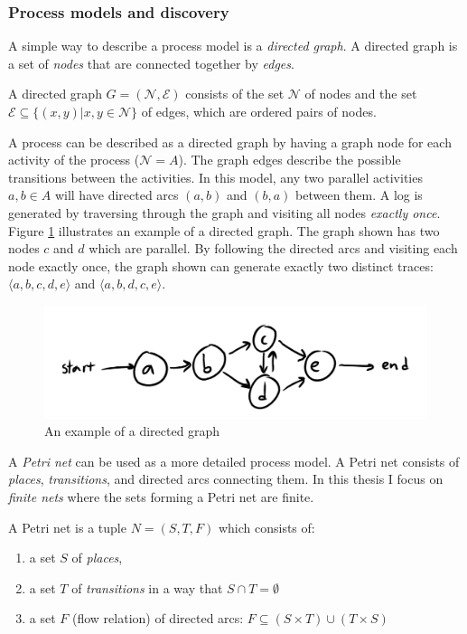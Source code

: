 \subsubsection{Process models and discovery}
\label{sec:processmodelsdsc}

A simple way to describe a process model is a \emph{directed graph}. A directed graph is a set of \emph{nodes} that are connected together by \emph{edges}. 

\begin{definition}
A directed graph $G = (\mathcal{N}, \mathcal{E})$ consists of the set $\mathcal{N}$ of nodes and the set $\mathcal{E} \subseteq \{ (x,y) | x,y \in \mathcal{N} \} $ of edges, which are ordered pairs of nodes.
\end{definition}

A process can be described as a directed graph by having a graph node for each activity of the process ($\mathcal{N} = A$). The graph edges describe the possible transitions between the activities.
In this model, any two parallel activities $a, b \in A$ will have directed arcs $(a,b)$ and $(b,a)$ between them.
A log is generated by traversing through the graph and visiting all nodes \textit{exactly once}.
Figure \ref{fig:directedgraph} illustrates an example of a directed graph.
The graph shown has two nodes $c$ and $d$ which are parallel.
By following the directed arcs and visiting each node exactly once, the graph shown can generate exactly two distinct traces: $\langle a,b,c,d,e \rangle$ and $\langle a,b,d,c,e \rangle$.

\begin{figure}[htb]
\centering \includegraphics[width=0.7\linewidth]{gfx/figures/directedgraph.png}
\caption{An example of a directed graph}
\label{fig:directedgraph}
\end{figure}

A \emph{Petri net} \cite{rozenberg1998lectures} can be used as a more detailed process model. A Petri net consists of \emph{places}, \emph{transitions}, and directed arcs connecting them. In this thesis I focus on \emph{finite nets} where the sets forming a Petri net are finite.

\begin{definition}
A Petri net is a tuple $N = (S, T, F)$ which consists of:
\begin{enumerate}
    \item a set $S$ of \emph{places},
    \item a set $T$ of \emph{transitions} in a way that $S \cap T = \emptyset$
    \item a set $F$ (flow relation) of directed arcs: $F \subseteq (S \times T) \cup (T \times S)$ 
\end{enumerate}
\end{definition}

